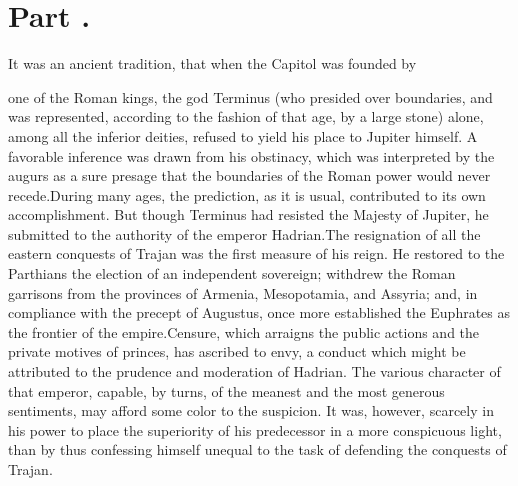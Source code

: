 \section{Part \thesection.}
\thispagestyle{simple}

It was an ancient tradition, that when the Capitol was founded by
one of the Roman kings, the god Terminus (who presided over
boundaries, and was represented, according to the fashion of that
age, by a large stone) alone, among all the inferior deities,
refused to yield his place to Jupiter himself. A favorable
inference was drawn from his obstinacy, which was interpreted by
the augurs as a sure presage that the boundaries of the Roman
power would never recede.\footnotemark[22] During many ages, the prediction, as
it is usual, contributed to its own accomplishment. But though
Terminus had resisted the Majesty of Jupiter, he submitted to the
authority of the emperor Hadrian.\footnotemark[23] The resignation of all the
eastern conquests of Trajan was the first measure of his reign.
He restored to the Parthians the election of an independent
sovereign; withdrew the Roman garrisons from the provinces of
Armenia, Mesopotamia, and Assyria; and, in compliance with the
precept of Augustus, once more established the Euphrates as the
frontier of the empire.\footnotemark[24] Censure, which arraigns the public
actions and the private motives of princes, has ascribed to envy,
a conduct which might be attributed to the prudence and
moderation of Hadrian. The various character of that emperor,
capable, by turns, of the meanest and the most generous
sentiments, may afford some color to the suspicion. It was,
however, scarcely in his power to place the superiority of his
predecessor in a more conspicuous light, than by thus confessing
himself unequal to the task of defending the conquests of Trajan.




